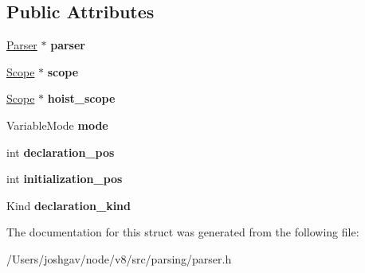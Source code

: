 \subsection*{Public Attributes}
\begin{DoxyCompactItemize}
\item 
\hyperlink{classv8_1_1internal_1_1_parser}{Parser} $\ast$ {\bfseries parser}\hypertarget{structv8_1_1internal_1_1_parser_1_1_declaration_descriptor_a85c7cc19fb9a95ce77d48165d29e0a46}{}\label{structv8_1_1internal_1_1_parser_1_1_declaration_descriptor_a85c7cc19fb9a95ce77d48165d29e0a46}

\item 
\hyperlink{classv8_1_1internal_1_1_scope}{Scope} $\ast$ {\bfseries scope}\hypertarget{structv8_1_1internal_1_1_parser_1_1_declaration_descriptor_af25cc6f669be5e6d8a304c6165f92785}{}\label{structv8_1_1internal_1_1_parser_1_1_declaration_descriptor_af25cc6f669be5e6d8a304c6165f92785}

\item 
\hyperlink{classv8_1_1internal_1_1_scope}{Scope} $\ast$ {\bfseries hoist\+\_\+scope}\hypertarget{structv8_1_1internal_1_1_parser_1_1_declaration_descriptor_a36d085df39c8973e2b6572f04802b5d9}{}\label{structv8_1_1internal_1_1_parser_1_1_declaration_descriptor_a36d085df39c8973e2b6572f04802b5d9}

\item 
Variable\+Mode {\bfseries mode}\hypertarget{structv8_1_1internal_1_1_parser_1_1_declaration_descriptor_afa3aaab22957d873b9723924f1f72c0e}{}\label{structv8_1_1internal_1_1_parser_1_1_declaration_descriptor_afa3aaab22957d873b9723924f1f72c0e}

\item 
int {\bfseries declaration\+\_\+pos}\hypertarget{structv8_1_1internal_1_1_parser_1_1_declaration_descriptor_a0e547c6e60cce5a18557e9fe4b8b3cdf}{}\label{structv8_1_1internal_1_1_parser_1_1_declaration_descriptor_a0e547c6e60cce5a18557e9fe4b8b3cdf}

\item 
int {\bfseries initialization\+\_\+pos}\hypertarget{structv8_1_1internal_1_1_parser_1_1_declaration_descriptor_ad75069311cd22a1ec9468ac15cad9355}{}\label{structv8_1_1internal_1_1_parser_1_1_declaration_descriptor_ad75069311cd22a1ec9468ac15cad9355}

\item 
Kind {\bfseries declaration\+\_\+kind}\hypertarget{structv8_1_1internal_1_1_parser_1_1_declaration_descriptor_afacaf1bbbf229bdb4b2fc1098a0116da}{}\label{structv8_1_1internal_1_1_parser_1_1_declaration_descriptor_afacaf1bbbf229bdb4b2fc1098a0116da}

\end{DoxyCompactItemize}


The documentation for this struct was generated from the following file\+:\begin{DoxyCompactItemize}
\item 
/\+Users/joshgav/node/v8/src/parsing/parser.\+h\end{DoxyCompactItemize}
